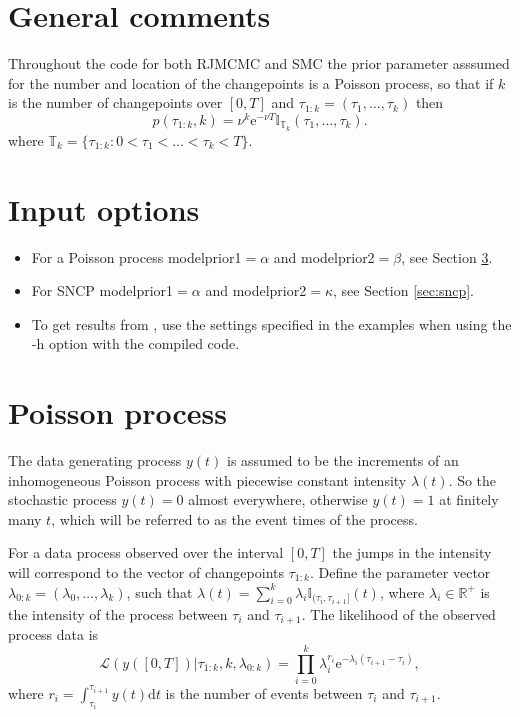 \documentclass{article}
\newcommand{\I}{\mathbb{I}}
\newcommand{\diff}{\mathrm{d}}
\begin{document}
\section{General comments} 
Throughout the code for both RJMCMC and SMC the prior parameter asssumed for the number and location of the changepoints is a Poisson process, so that if $k$ is the number of changepoints over $[0,T]$ and $\tau_{1:k}=(\tau_{1},\ldots,\tau_{k})$ then 
\begin{equation}
p(\tau_{1:k},k)=\nu^{k}\mbox{e}^{-\nu T}\mathbb{I}_{\mathbb{T}_{k}}(\tau_{1},\ldots,\tau_{k}).
\label{eq:priorchangepoints}
\end{equation}
where $\mathbb{T}_{k}=\{\tau_{ 1:k}:0<\tau_{1}<\ldots<\tau_{k}<T\}$.

\section{Input options}
\begin{itemize}
\item For a Poisson process modelprior1$=\alpha$ and modelprior2$=\beta$, see Section \ref{sec:pp}. 

\item For SNCP modelprior1$=\alpha$ and modelprior2$=\kappa$, see Section \ref{sec:sncp}.
\item To get results from \cite{turcotte15}, use the settings specified in the examples when using the -h option with the compiled code. 
\end{itemize}
\section{Poisson process}\label{sec:pp}
The data generating process $y(t)$ is assumed to be the increments of an inhomogeneous Poisson process with piecewise constant intensity $\lambda(t)$. So the stochastic process $y(t)=0$ almost everywhere, otherwise $y(t)=1$ at finitely many $t$, which will be referred to as the event times of the process.

For a data process observed over the interval $[0,T]$ the jumps in the intensity will correspond to the vector of changepoints $\tau_{1:k}$. Define the parameter vector $\lambda_{0:k}=(\lambda_{0},\ldots,\lambda_{k})$, such that $\lambda(t)=\sum_{i=0}^{k}\lambda_i\I_{(\tau_i,\tau_{i+1}]}(t)$, where $\lambda_{i}\in \mathbb{R}^{+}$ is the intensity of the process between $\tau_{i}$ and $\tau_{i+1}$. The likelihood of the observed process data is
$$
\mathcal{L}(y([0,T])|\tau_{1:k},k,\lambda_{0:k})=\prod_{i=0}^{k}\lambda_{i}^{r_{i}}\mbox{e}^{-\lambda_{i}(\tau_{i+1}-\tau_{i})},
$$
where $r_{i}=\int_{\tau_i}^{\tau_{i+1}}y(t)\diff t$ is the number of events between $\tau_{i}$ and $\tau_{i+1}$.
\end{document}
